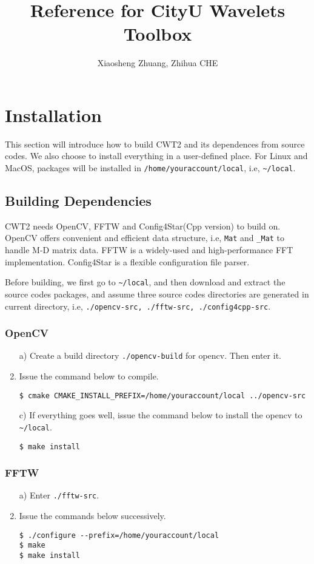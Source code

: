 \documentclass[a4paper,5pt]{article}
\title{Reference for CityU Wavelets Toolbox}
\author{Xiaosheng Zhuang,    Zhihua CHE}
\date{}
\begin{document}
\maketitle

\tableofcontents

\section{Installation}
This section will introduce how to build CWT2 and its dependences from source codes. We also choose to install everything in a user-defined place. For Linux and MacOS, packages will be installed in \lstinline{/home/youraccount/local}, i.e, \lstinline{~/local}.

\subsection{Building Dependencies}
  CWT2 needs OpenCV, FFTW and Config4Star(Cpp version) to build on. OpenCV offers convenient and efficient data structure, i.e, \lstinline{Mat} and \lstinline{_Mat} to handle M-D matrix data. FFTW is a widely-used and high-performance FFT implementation. Config4Star is a flexible configuration file parser.
  
  Before building, we first go to \lstinline{~/local}, and then download and extract the source codes packages, and assume three source codes directories are generated in current directory, i.e, \lstinline{./opencv-src, ./fftw-src, ./config4cpp-src}.
  
\subsubsection{OpenCV}

\begin{enumerate}

\item[a)] Create a build directory \lstinline{./opencv-build} for opencv. Then enter it.
\item[b)] Issue the command below to compile.

\lstinline{$ cmake CMAKE_INSTALL_PREFIX=/home/youraccount/local ../opencv-src}
\item[c)] If everything goes well, issue the command below to install the opencv to \lstinline{~/local}.

\lstinline{$ make install}
\end{enumerate}

\subsubsection{FFTW}
\begin{enumerate}
\item[a)] Enter \lstinline{./fftw-src}.
\item[b)] Issue the commands below successively.

\lstinline{$ ./configure --prefix=/home/youraccount/local}    \\
\lstinline{$ make}                                            \\
\lstinline{$ make install}
\end{enumerate}
\end{document}
